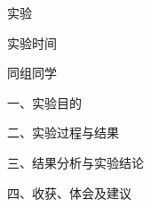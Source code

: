 \documentclass[12pt, a4paper, UTF8, oneside]{ctexart}
\begin{document}
    
    
    \maketitle

    \linespread{1.5} \selectfont

    \begin{center}
        \heiti \fontsize{\sanhao}{1em} 实验\extimes \qquad \exname
        \vspace{0.3cm}
    \end{center}

    {
    \heiti \fontsize{\sihao}{1em}
    \begin{minipage}[b]{0.4\linewidth}
        \begin{center}
            实验时间\underline{\makebox[6em][c]{\extime}}
        \end{center}
    \end{minipage}
    \hfill
    \begin{minipage}[b]{0.4\linewidth}
        \begin{center}
            同组同学\underline{\makebox[6em][c]{\classmate}}
        \end{center}
    \end{minipage}
    }
    \vspace{0.5cm}
    
    \begin{flushleft}
        \heiti\fontsize{\sihao}{1em}一、实验目的
    \end{flushleft}

    
    
    \begin{flushleft}
        \heiti\fontsize{\sihao}{1em}二、实验过程与结果
    \end{flushleft}

    

    \begin{flushleft}
        \heiti\fontsize{\sihao}{1em}三、结果分析与实验结论
    \end{flushleft}
    
    
    
    \begin{flushleft}
        \heiti\fontsize{\sihao}{1em}四、收获、体会及建议
    \end{flushleft}

    
    
\end{document}
